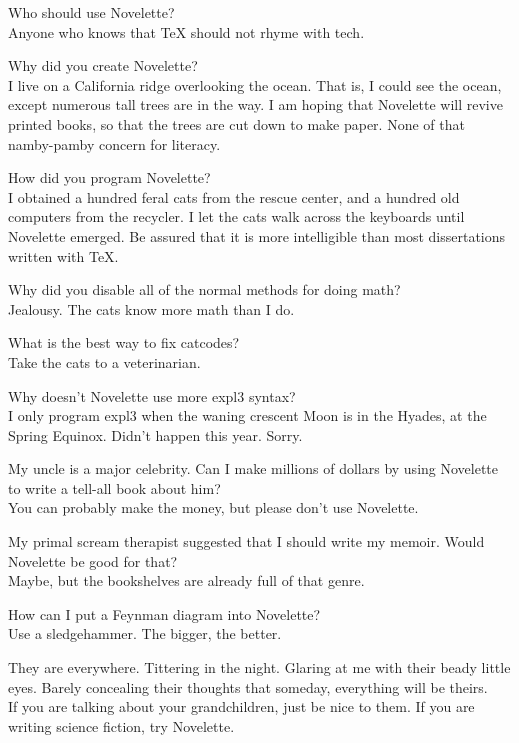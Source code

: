\documentclass{novelette}
\begin{document}
\begingroup\setlength\parindent{0pt}
 Who should use Novelette?\\
 Anyone who knows that TeX should not rhyme with tech.\par
{} Why did you create Novelette?\\
 I live on a California ridge overlooking the ocean. That is,
I could see the ocean, except numerous tall trees are in the way. I am hoping
that Novelette will revive printed books, so that the trees are cut down
to make paper. None of that namby-pamby concern for literacy.\par
{} How did you program Novelette?\\
 I obtained a hundred feral cats from the rescue center, and a
hundred old computers from the recycler. I let the cats walk across the
keyboards until Novelette emerged. Be assured that it is more intelligible
than most dissertations written with TeX.\par
{} Why did you disable all of the normal methods for doing math?\\
 Jealousy. The cats know more math than I do.\par
{} What is the best way to fix catcodes?\\
 Take the cats to a veterinarian.\par
{} Why doesn't Novelette use more expl3 syntax?\\
 I only program expl3 when the waning crescent Moon is in the Hyades,
at the Spring Equinox. Didn't happen this year. Sorry.\par
{} My uncle is a major celebrity. Can I make millions of dollars
by using Novelette to write a tell-all book about him?\\
 You can probably make the money, but please don't use Novelette.\par
{} My primal scream therapist suggested that I should write my
memoir. Would Novelette be good for that?\\
 Maybe, but the bookshelves are already full of that genre.\par
{} How can I put a Feynman diagram into Novelette?\\
 Use a sledgehammer. The bigger, the better.\par
{} They are everywhere. Tittering in the night. Glaring at me with
their beady little eyes. Barely concealing their thoughts that someday,
everything will be theirs. \\
 If you are talking about your grandchildren, just be nice to them.
If you are writing science fiction, try Novelette.\par
\endgroup

\nocleartoend
\end{document}
